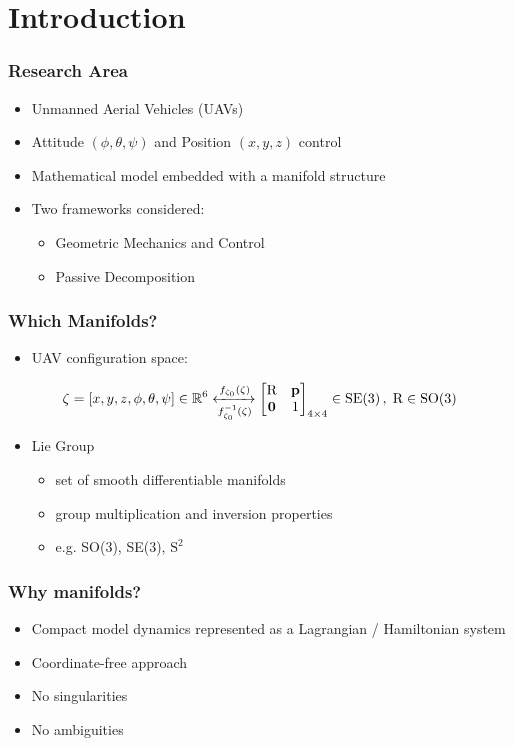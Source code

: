 
\section{Introduction}

\begin{frame}
	\frametitle{Research Area}
	
	\begin{itemize}
		\item Unmanned Aerial Vehicles (UAVs)
		\item Attitude $(\phi, \theta, \psi)$ and Position $(x, y, z)$ control
		\item Mathematical model embedded with a manifold structure
		\item Two frameworks considered:
		
		\begin{itemize}
			\item Geometric Mechanics and Control
			\item Passive Decomposition
		\end{itemize}
	\end{itemize}
\end{frame}

\begin{frame}
	\frametitle{Which Manifolds?}
	
	\begin{itemize}
		\item UAV configuration space:
	\end{itemize}
	\begin{equation*}
		\zeta = [x, y, z, \phi, \theta, \psi] \in \mathbb{R}^6 
		\xleftrightarrow[f_{\zeta_0}^{-1}(\zeta)]{f_{\zeta_0}(\zeta)}
		\begin{bmatrix}
		\text{R} & \textbf{p} \\
		\textbf{0} & 1
		\end{bmatrix}_{4\times 4} \in \text{SE(3)} \, , \; \text{R} \in \text{SO(3)}
	\end{equation*}
	
	\begin{itemize}
		\item Lie Group
		\begin{itemize}
			\item set of smooth differentiable manifolds
			\item group multiplication and inversion properties
			\item e.g. SO(3), SE(3), $\text{S}^2$
		\end{itemize}
	\end{itemize}
\end{frame}

\begin{frame}
	\frametitle{Why manifolds?}
	
	\begin{itemize}
		\item Compact model dynamics represented as a Lagrangian / Hamiltonian system
		\item Coordinate-free approach
		\item No singularities
		\item No ambiguities
	\end{itemize}
\end{frame}